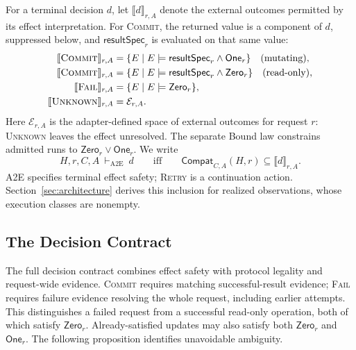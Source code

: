 \documentclass[acmsmall,screen,review,anonymous]{acmart}
\newcommand{\Unknown}{\textsc{Unknown}\xspace}
\newcommand{\Commit}{\textsc{Commit}\xspace}
\newcommand{\Fail}{\textsc{Fail}\xspace}
\newcommand{\Retry}{\textsc{Retry}\xspace}
\begin{document}
For a terminal decision $d$, let $\llbracket d\rrbracket_{r,A}$ denote
the external outcomes permitted by its effect interpretation. For \Commit,
the returned value is a component of $d$, suppressed below, and
$\mathsf{resultSpec}_r$ is evaluated on that same value:
\[
\begin{aligned}
\llbracket\Commit\rrbracket_{r,A}
  &= \{E \mid E \models \mathsf{resultSpec}_r
      \land \mathsf{One}_r\}\quad\text{(mutating)},\\
\llbracket\Commit\rrbracket_{r,A}
  &= \{E \mid E \models \mathsf{resultSpec}_r
      \land \mathsf{Zero}_r\}\quad\text{(read-only)},\\
\llbracket\Fail\rrbracket_{r,A}
  &= \{E \mid E \models \mathsf{Zero}_r\},\\
  \llbracket\Unknown\rrbracket_{r,A}
   &= \mathcal{E}_{r,A}.
\end{aligned}
\]
Here $\mathcal{E}_{r,A}$ is the adapter-defined space of external outcomes
for request $r$: \Unknown leaves the effect unresolved. The separate Bound
law constrains admitted runs to $\mathsf{Zero}_r\lor\mathsf{One}_r$.
We write
\[
  H,r,C,A\ \vdash_{\mathrm{A2E}}\ d
\qquad\text{iff}\qquad
  \mathsf{Compat}_{C,A}(H,r)\subseteq\llbracket d\rrbracket_{r,A}.
\]
A2E specifies terminal effect safety; \Retry is a continuation action.
Section~\ref{sec:architecture} derives this inclusion for realized observations, whose execution classes are nonempty.

\subsection{The Decision Contract}

The full decision contract combines effect safety with protocol legality
and request-wide evidence. \Commit requires matching successful-result
evidence; \Fail requires failure evidence resolving the whole request,
including earlier attempts. This distinguishes a failed request from a
successful read-only operation, both of which satisfy $\mathsf{Zero}_r$.
Already-satisfied updates may also satisfy both $\mathsf{Zero}_r$ and
$\mathsf{One}_r$. The following proposition identifies unavoidable ambiguity.
\end{document}
